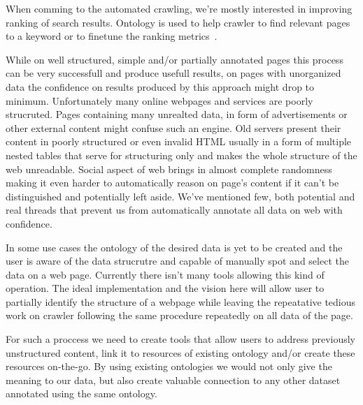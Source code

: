 When comming to the automated crawling, we're mostly interested in improving
ranking of search results. Ontology is used to help crawler to find relevant
pages to a keyword or to finetune the ranking
metrics~. 



While on well structured, simple and/or partially annotated pages this process
can be very successfull and produce usefull results, on pages with unorganized
data the confidence on results produced by this approach might drop to minimum. 
Unfortunately many online webpages and services are poorly strucruted. Pages
containing many unrealted data, in form of advertisements or other external
content might confuse such an engine. Old servers present their content in
poorly structured or even invalid HTML usually in a form of multiple nested
tables that serve for structuring only and makes the whole structure of the web
unreadable. Social aspect of web brings in almost complete randomness
making it even harder to automatically reason on page's content if it can't be
distinguished and potentially left aside. We've mentioned few, both potential
and real threads that prevent us from automatically annotate all data on web
with confidence. 

In some use cases the ontology of the desired data is yet to be created and the
user is aware of the data strucrutre and capable of manually spot and select
the data on a web page. Currently there isn't many tools allowing this kind of
operation. The ideal implementation and the vision here will allow user to
partially identify the structure of a webpage while leaving the repeatative
tedious work on crawler following the same procedure repeatedly on all data of
the page. 

For such a proccess we need to create tools that allow users to address
previously unstructured content, link it to resources of existing ontology
and/or create these resources on-the-go. By using existing ontologies we would
not only give the meaning to our data, but also create valuable connection to
any other dataset annotated using the same ontology. 


